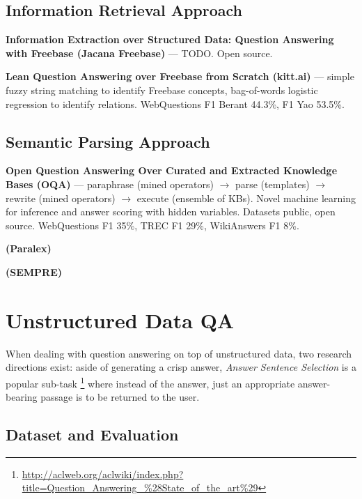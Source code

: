 \subsection{Information Retrieval Approach}

\textbf{Information Extraction over Structured Data: Question Answering with Freebase (Jacana Freebase)} \citep{TreeFreebase2014Yao}
	--- TODO.
		Open source.

\textbf{Lean Question Answering over Freebase from Scratch (kitt.ai)} \citep{LeanFreebaseYao}
	--- simple fuzzy string matching to identify Freebase concepts,
		bag-of-words logistic regression to identify relations.
		WebQuestions F1 Berant 44.3\%, F1 Yao 53.5\%.

\subsection{Semantic Parsing Approach}

\textbf{Open Question Answering Over Curated and Extracted Knowledge Bases (OQA)} \citep{OQA}
	--- paraphrase (mined operators) $\to$ parse (templates) $\to$ rewrite (mined operators) $\to$ execute (ensemble of KBs).
	Novel machine learning for inference and answer scoring with hidden variables.
	Datasets public, open source.
	WebQuestions F1 35\%, TREC F1 29\%, WikiAnswers F1 8\%.

\textbf{(Paralex)} \citep{Fader2013Paraphrase}

\textbf{(SEMPRE)} \citep{SPBerant2014Paraphrase}





\section{Unstructured Data QA}
\label{sec:unstructured}

When dealing with question answering on top of unstructured data,
two research directions exist: aside of generating a crisp answer,
\textit{Answer Sentence Selection} is a popular sub-task%
\footnote{\url{http://aclweb.org/aclwiki/index.php?title=Question_Answering_\%28State_of_the_art\%29}}
where instead of the answer, just an appropriate answer-bearing passage
is to be returned to the user.

\subsection{Dataset and Evaluation}

